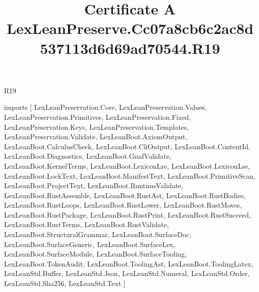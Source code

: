 \begin{lexlean}{R19}
\title{Certificate A LexLeanPreserve.Cc07a8cb6c2ac8d537113d6d69ad70544.R19}
\begin{coremodule}
imports [
  LexLeanPreservation.Core,
  LexLeanPreservation.Values,
  LexLeanPreservation.Primitives,
  LexLeanPreservation.Fixed,
  LexLeanPreservation.Keys,
  LexLeanPreservation.Templates,
  LexLeanPreservation.Validate,
  LexLeanBoot.AxiomOutput,
  LexLeanBoot.CalculusCheck,
  LexLeanBoot.CliOutput,
  LexLeanBoot.ContentId,
  LexLeanBoot.Diagnostics,
  LexLeanBoot.GnafValidate,
  LexLeanBoot.KernelTerms,
  LexLeanBoot.LexiconLre,
  LexLeanBoot.LexiconLse,
  LexLeanBoot.LockText,
  LexLeanBoot.ManifestText,
  LexLeanBoot.PrimitiveScan,
  LexLeanBoot.ProjectText,
  LexLeanBoot.RuntimeValidate,
  LexLeanBoot.RustAssemble,
  LexLeanBoot.RustAst,
  LexLeanBoot.RustBodies,
  LexLeanBoot.RustLoops,
  LexLeanBoot.RustLower,
  LexLeanBoot.RustMoves,
  LexLeanBoot.RustPackage,
  LexLeanBoot.RustPrint,
  LexLeanBoot.RustSucceed,
  LexLeanBoot.RustTerms,
  LexLeanBoot.RustValidate,
  LexLeanBoot.StructuralGrammar,
  LexLeanBoot.SurfaceDoc,
  LexLeanBoot.SurfaceGeneric,
  LexLeanBoot.SurfaceLex,
  LexLeanBoot.SurfaceModule,
  LexLeanBoot.SurfaceTooling,
  LexLeanBoot.TokenAudit,
  LexLeanBoot.ToolingAst,
  LexLeanBoot.ToolingLatex,
  LexLeanStd.Buffer,
  LexLeanStd.Json,
  LexLeanStd.Numeral,
  LexLeanStd.Order,
  LexLeanStd.Sha256,
  LexLeanStd.Text
]


\end{coremodule}
\end{lexlean}
